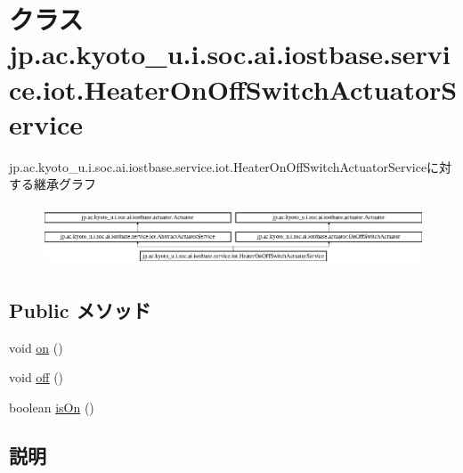 \hypertarget{classjp_1_1ac_1_1kyoto__u_1_1i_1_1soc_1_1ai_1_1iostbase_1_1service_1_1iot_1_1_heater_on_off_switch_actuator_service}{\section{クラス jp.\-ac.\-kyoto\-\_\-u.\-i.\-soc.\-ai.\-iostbase.\-service.\-iot.\-Heater\-On\-Off\-Switch\-Actuator\-Service}
\label{classjp_1_1ac_1_1kyoto__u_1_1i_1_1soc_1_1ai_1_1iostbase_1_1service_1_1iot_1_1_heater_on_off_switch_actuator_service}
}
jp.\-ac.\-kyoto\-\_\-u.\-i.\-soc.\-ai.\-iostbase.\-service.\-iot.\-Heater\-On\-Off\-Switch\-Actuator\-Serviceに対する継承グラフ\begin{figure}[H]
\begin{center}
\leavevmode
\includegraphics[height=1.826087cm]{classjp_1_1ac_1_1kyoto__u_1_1i_1_1soc_1_1ai_1_1iostbase_1_1service_1_1iot_1_1_heater_on_off_switch_actuator_service}
\end{center}
\end{figure}
\subsection*{Public メソッド}
\begin{DoxyCompactItemize}
\item 
void \hyperlink{classjp_1_1ac_1_1kyoto__u_1_1i_1_1soc_1_1ai_1_1iostbase_1_1service_1_1iot_1_1_heater_on_off_switch_actuator_service_aa65e652502d5a12b045aa945736772ff}{on} ()
\item 
void \hyperlink{classjp_1_1ac_1_1kyoto__u_1_1i_1_1soc_1_1ai_1_1iostbase_1_1service_1_1iot_1_1_heater_on_off_switch_actuator_service_a3aedee5808796550e34f62331f5b16c0}{off} ()
\item 
boolean \hyperlink{classjp_1_1ac_1_1kyoto__u_1_1i_1_1soc_1_1ai_1_1iostbase_1_1service_1_1iot_1_1_heater_on_off_switch_actuator_service_aee741a44ea64ef328ea051b4b8d0ebfe}{is\-On} ()
\end{DoxyCompactItemize}


\subsection{説明}


